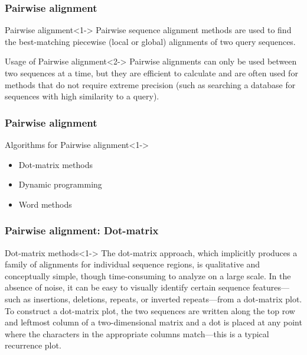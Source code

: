 \documentclass[UTF8]{beamer}
\begin{document}
	\begin{frame}
	    \frametitle{Pairwise alignment}
		\begin{block}{Pairwise alignment}<1->
			Pairwise sequence alignment methods are used to find the best-matching piecewise (local or global) alignments of \alert{two} query sequences. 
		\end{block}
		\begin{block}{Usage of Pairwise alignment}<2->
			Pairwise alignments can only be used between two sequences at a time, 
			but they are efficient to calculate and are often used for methods that do not require extreme precision 
			(such as searching a database for sequences with high similarity to a query).
		\end{block}
    \end{frame}

	\begin{frame}
	    \frametitle{Pairwise alignment}
		\begin{block}{Algorithms for Pairwise alignment}<1->
			\begin{itemize}
				\item Dot-matrix methods
				\item Dynamic programming
				\item Word methods
			\end{itemize} 
		\end{block}
    \end{frame}

	\begin{frame}
	    \frametitle{Pairwise alignment: Dot-matrix}
		\begin{block}{Dot-matrix methods}<1->
			The dot-matrix approach, which implicitly produces a family of alignments for individual sequence regions, 
			is qualitative and conceptually simple, though time-consuming to analyze on a large scale. 
			In the absence of noise, it can be easy to visually identify certain sequence features—such as insertions, deletions, repeats, or inverted repeats—from a dot-matrix plot. 
			To construct a dot-matrix plot, the two sequences are written along the top row and leftmost column of a two-dimensional matrix and a dot is placed at any point where the characters in the appropriate columns match—this is a typical recurrence plot.
		\end{block}
    \end{frame}
\end{document}
